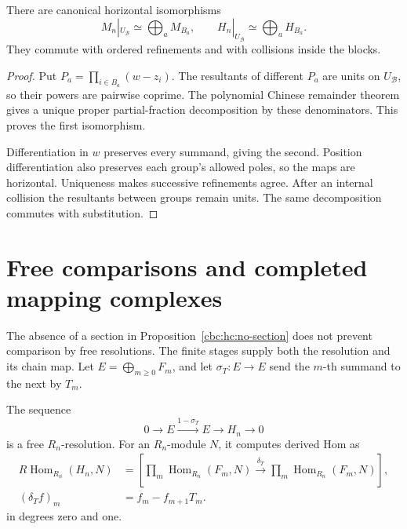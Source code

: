 \begin{proposition}\label{cbc:hc:cuts}
There are canonical horizontal isomorphisms
\begin{equation}\label{cbc:hc:cut-decomposition}
 M_n|_{U_{\mathcal B}}\simeq\bigoplus_aM_{B_a},\qquad
 H_n|_{U_{\mathcal B}}\simeq\bigoplus_aH_{B_a}.
\end{equation}
They commute with ordered refinements and with collisions
inside the blocks.
\end{proposition}

\begin{proof}
Put $P_a=\prod_{i\in B_a}(w-z_i)$. The resultants of
different $P_a$ are units on $U_{\mathcal B}$, so their
powers are pairwise coprime. The polynomial Chinese
remainder theorem gives a unique proper partial-fraction
decomposition by these denominators. This proves the first
isomorphism.

Differentiation in $w$ preserves every summand,
giving the second. Position differentiation also preserves
each group's allowed poles, so the maps are horizontal.
Uniqueness makes successive refinements agree. After an
internal collision the resultants between groups remain
units. The same decomposition commutes with substitution.
\end{proof}

\section{Free comparisons and completed mapping complexes}
\label{cbc:hc:free-comparison}

The absence of a section in Proposition~\ref{cbc:hc:no-section}
does not prevent comparison by free resolutions. The finite
stages supply both the resolution and its chain map.
Let $E=\bigoplus_{m\geq0}F_m$, and let $\sigma_T:E\to E$
send the $m$-th summand to the next by $T_m$.

\begin{proposition}\label{cbc:hc:telescope}
The sequence
\begin{equation}\label{cbc:hc:telescope-sequence}
 0\longrightarrow E\xrightarrow{1-\sigma_T}E
 \longrightarrow H_n\longrightarrow0
\end{equation}
is a free $R_n$-resolution. For an $R_n$-module $N$,
it computes derived Hom as
\begin{equation}\label{cbc:hc:mapping-complex}
 \begin{aligned}
 R\operatorname{Hom}_{R_n}(H_n,N)
 &=\left[\prod_m\operatorname{Hom}_{R_n}(F_m,N)
 \xrightarrow{\delta_T}
 \prod_m\operatorname{Hom}_{R_n}(F_m,N)\right],
 \\
 (\delta_Tf)_m&=f_m-f_{m+1}T_m.
 \end{aligned}
\end{equation}
in degrees zero and one.
\end{proposition}

